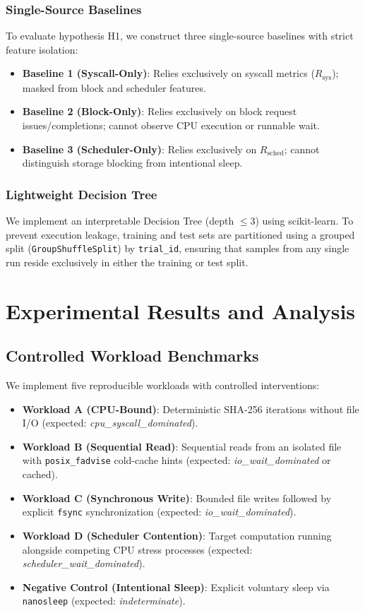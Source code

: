 \documentclass[conference]{IEEEtran}
\begin{document}
\subsubsection{Single-Source Baselines}
To evaluate hypothesis H1, we construct three single-source baselines with strict feature isolation:
\begin{itemize}
    \item \textbf{Baseline 1 (Syscall-Only)}: Relies exclusively on syscall metrics ($R_{\text{sys}}$); masked from block and scheduler features.
    \item \textbf{Baseline 2 (Block-Only)}: Relies exclusively on block request issues/completions; cannot observe CPU execution or runnable wait.
    \item \textbf{Baseline 3 (Scheduler-Only)}: Relies exclusively on $R_{\text{sched}}$; cannot distinguish storage blocking from intentional sleep.
\end{itemize}

\subsubsection{Lightweight Decision Tree}
We implement an interpretable Decision Tree (depth $\le 3$) using scikit-learn. To prevent execution leakage, training and test sets are partitioned using a grouped split (\texttt{GroupShuffleSplit}) by \texttt{trial\_id}, ensuring that samples from any single run reside exclusively in either the training or test split.

\section{Experimental Results and Analysis}

\subsection{Controlled Workload Benchmarks}
We implement five reproducible workloads with controlled interventions:
\begin{itemize}
    \item \textbf{Workload A (CPU-Bound)}: Deterministic SHA-256 iterations without file I/O (expected: \textit{cpu\_syscall\_dominated}).
    \item \textbf{Workload B (Sequential Read)}: Sequential reads from an isolated file with \texttt{posix\_fadvise} cold-cache hints (expected: \textit{io\_wait\_dominated} or cached).
    \item \textbf{Workload C (Synchronous Write)}: Bounded file writes followed by explicit \texttt{fsync} synchronization (expected: \textit{io\_wait\_dominated}).
    \item \textbf{Workload D (Scheduler Contention)}: Target computation running alongside competing CPU stress processes (expected: \textit{scheduler\_wait\_dominated}).
    \item \textbf{Negative Control (Intentional Sleep)}: Explicit voluntary sleep via \texttt{nanosleep} (expected: \textit{indeterminate}).
\end{itemize}
\end{document}

